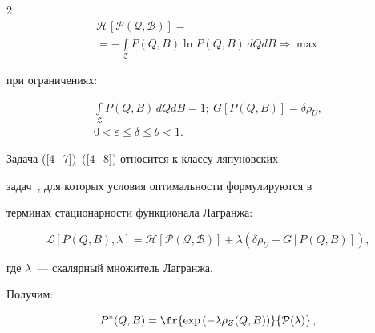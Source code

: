 \begin{multicols}{2}
\begin{multline}
\label{4_7}


\mathcal{H[P(Q,B)]} ={}\\


{}= - \int\limits_{\mathcal{Z}} P(Q,B) \ln P(Q,B)\, dQ dB 


\Rightarrow \max


\end{multline}


при ограничениях:


\begin{multline}






\displaystyle \int\limits_{\mathcal{Z}} P(Q,B)\,dQ dB = 1;\ G[P(Q,B)] = \delta \rho_U,\\


0 < \varepsilon \le \delta \le \theta < 1.






\label{4_8}


\end{multline}





Задача (\ref{4_7})--(\ref{4_8}) относится к классу ляпуновских 


задач~\cite{Joffe_1974}, для которых условия оптимальности формулируются в 


терминах стационарности функционала Лагранжа:


\begin{equation*}




\mathcal{L}[P(Q,B), \lambda] = \mathcal{H[P(Q,B)]} + \lambda \left(\delta 


\rho_U - G[P(Q,B)]\right),


\end{equation*}


где $\lambda$~--- скалярный множитель Лагранжа.





Получим:


\begin{equation}


\label{4_10}


P^*(Q,B) = 


\fr{\exp\left(- \lambda \rho_Z(Q,B) \right)}{\mathcal{P}(\lambda)}\,,



\end{equation}
\end{multicols}

